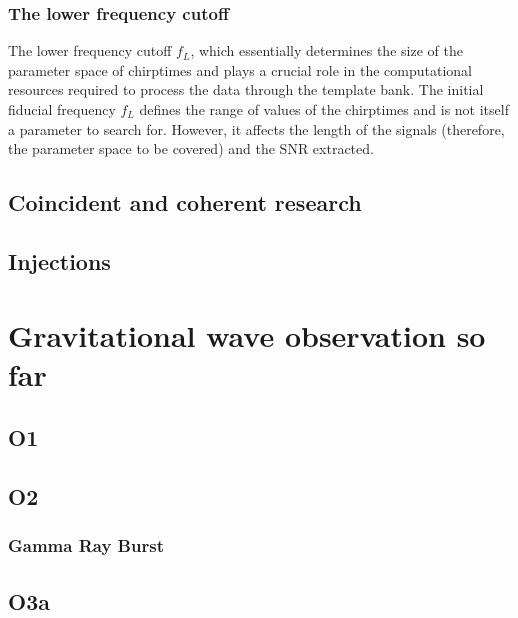 \documentclass[binding=0.6cm, LaM]{sapthesis}
\begin{document}
\subsection{The lower frequency cutoff}

	The lower frequency cutoff $f_L$, which essentially determines the size of the parameter space 
	of chirptimes and plays a crucial role in the computational resources required 
	to process the data through the template bank. 
	The initial fiducial frequency $f_L$ defines the range of values of the chirptimes 
	and is not itself a parameter to search for. 
	However, it affects the length of the signals 
	(therefore, the parameter space to be covered) and the SNR extracted. 

\section{Coincident and coherent research}

\section{Injections}


\chapter{Gravitational wave observation so far}

\section{O1}

\section{O2}

\subsection{Gamma Ray Burst}

\section{O3a}
\end{document}
